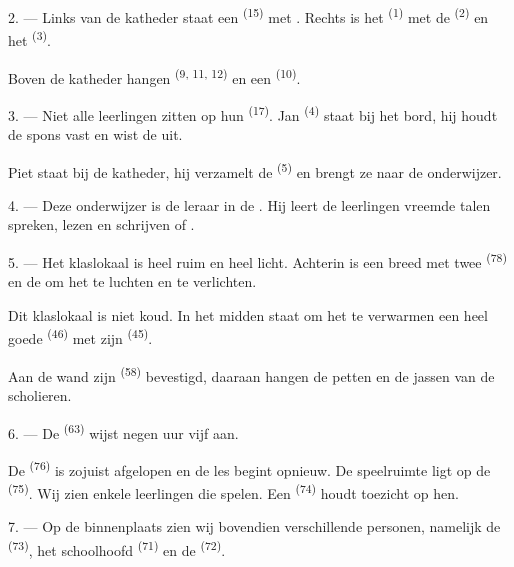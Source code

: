 2. --- Links van de katheder staat een  \textsuperscript{(15)} met
. Rechts is het 
\textsuperscript{(1)} met de  \textsuperscript{(2)} en het
 \textsuperscript{(3)}.

Boven de katheder hangen  \textsuperscript{(9, 11, 12)} en een
 \textsuperscript{(10)}.

3. --- Niet alle leerlingen zitten op hun  \textsuperscript{(17)}. Jan
\textsuperscript{(4)} staat bij het bord, hij houdt de spons vast en wist de
 uit.

Piet staat bij de katheder, hij verzamelt de 
\textsuperscript{(5)} en brengt ze naar de onderwijzer.

4. --- Deze onderwijzer is de leraar in de . Hij leert de leerlingen
vreemde talen spreken, lezen en schrijven 
of .

5. --- Het klaslokaal is heel ruim en heel licht. Achterin is een breed
 met twee  \textsuperscript{(78)} en de
 om het te luchten en te verlichten.

Dit klaslokaal is niet koud. In het midden staat om het te verwarmen een heel goede
 \textsuperscript{(46)} met zijn  \textsuperscript{(45)}.

Aan de wand zijn  \textsuperscript{(58)} bevestigd, daaraan hangen de
petten en de jassen van de scholieren.

\VUsaut{5.2mm}
\VUsaut{3.6mm}

6. --- De  \textsuperscript{(63)} wijst negen uur vijf aan.

De  \textsuperscript{(76)} is zojuist afgelopen en de les begint opnieuw. De
speelruimte ligt op de  \textsuperscript{(75)}. Wij zien enkele
leerlingen die spelen. Een
 \textsuperscript{(74)} houdt toezicht op hen.

7. --- Op de binnenplaats zien wij bovendien verschillende personen, namelijk de
 \textsuperscript{(73)}, het schoolhoofd
 \textsuperscript{(71)} en de 
\textsuperscript{(72)}.

